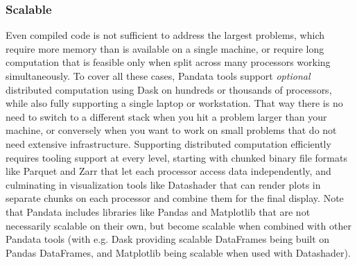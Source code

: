 \subsubsection{Scalable}
Even compiled code is not sufficient to address the largest problems, which require more memory than is available on a single machine, or require long computation that is feasible only when split across many processors working simultaneously. To cover all these cases, Pandata tools support \emph{optional} distributed computation using Dask \cite{dask} on hundreds or thousands of processors, while also fully supporting a single laptop or workstation. That way there is no need to switch to a different stack when you hit a problem larger than your machine, or conversely when you want to work on small problems that do not need extensive infrastructure. Supporting distributed computation efficiently requires tooling support at every level, starting with chunked binary file formats like Parquet and Zarr that let each processor access data independently, and culminating in visualization tools like Datashader that can render plots in separate chunks on each processor and combine them for the final display. Note that Pandata includes libraries like Pandas and Matplotlib that are not necessarily scalable on their own, but become scalable when combined with other Pandata tools (with e.g. Dask providing scalable DataFrames being built on Pandas DataFrames, and Matplotlib being scalable when used with Datashader).

